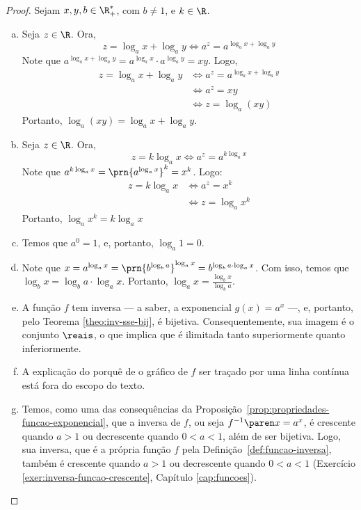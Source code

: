 \begin{proof}
	Sejam $x, y, b \in \R_+^*$, com $b \neq 1$, e $k \in \R$.
	\begin{enumerate}[(a)]
		\item 
		Seja $z \in \R$. Ora,
		\[
			z = \log_a x + \log_a y \iff a^z = a^{\log_a x + \log_a y} 
		\]
		Note que $a^{\log_a x + \log_a y}  = a^{\log_a x} \cdot a^{\log_a y} = xy$.
		Logo, 
		\begin{align*}
			z = \log_a x + \log_a y & \iff a^z = a^{\log_a x + \log_a y}\\
			& \iff a^z = xy \\
			& \iff z = \log_a(xy)
		\end{align*}
		Portanto, $\log_a(xy)=\log_a x + \log_a y$.

		\item Seja $z \in \R$.
		Ora, 
		\[
			z = k \log_a x \iff a^z = a^{k\log_a x}
		\]
		Note que $a^{k\log_a x} = \prn{a^{\log_a x}}^k = x^k$.
		Logo:
		\begin{align*}
			z = k \log_a x & \iff a^z = x^k \\ &\iff z = \log_a {x^k}
		\end{align*}
		Portanto, $\log_a{x^k}=k\log_a x$

		\item Temos que $a^0 = 1$, e, portanto, $\log_a 1 = 0$.

		\item Note que $x = a^{\log_a x} = \prn{b^{\log_b a}}^{\log_a x} = b^{\log_b a \cdot \log_a x}$.
		Com isso, temos que $\log_b x = \log_b a \cdot \log_a x$. Portanto, $\log_a x = \frac{\log_b x}{\log_b a}$.

		\item A função $f$ tem inversa --- a saber, a exponencial $g(x) =  a^x$ ---, e, portanto, pelo Teorema \ref{theo:inv-sse-bij}, é bijetiva.
		Consequentemente, sua imagem é o conjunto $\reais$, o que implica que é ilimitada tanto superiormente quanto inferiormente.

		\item A explicação do porquê de o gráfico de $f$ ser traçado por uma linha contínua está fora do escopo do texto.

		\item Temos, como uma das consequências da Proposição~\ref{prop:propriedades-funcao-exponencial}, que a inversa de $f$, ou seja $f^{-1} \paren x = a^x$, é crescente quando $a > 1$ ou decrescente quando $0 < a <1$, além de ser bijetiva.
		Logo, sua inversa, que é a própria função $f$ pela Definição~\ref{def:funcao-inversa}, também é crescente quando $a > 1$ ou decrescente quando $0 < a < 1$ (Exercício \ref{exer:inversa-funcao-crescente}, Capítulo \ref{cap:funcoes}).


	\end{enumerate}
\end{proof}


